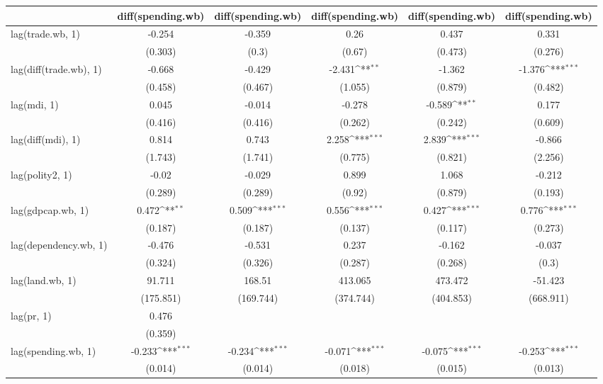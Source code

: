 \def\sym#1{\ifmmode^{#1}\else\(^{#1}\)\fi}
\begin{table}[htbp]
\centering

\begin{tabular}{l*{5}{c}}
\hline\hline
  &\multicolumn{1}{c}{diff(spending.wb)} &\multicolumn{1}{c}{diff(spending.wb)} &\multicolumn{1}{c}{diff(spending.wb)} &\multicolumn{1}{c}{diff(spending.wb)} &\multicolumn{1}{c}{diff(spending.wb)} \\
\hline
lag(trade.wb, 1) 		&-0.254 		&-0.359 		&0.26 		&0.437 		&0.331 \\
  		&(0.303) 		&(0.3) 		&(0.67) 		&(0.473) 		&(0.276) \\
lag(diff(trade.wb), 1) 		&-0.668 		&-0.429 		&-2.431\sym{**} 		&-1.362 		&-1.376\sym{***} \\
  		&(0.458) 		&(0.467) 		&(1.055) 		&(0.879) 		&(0.482) \\
lag(mdi, 1) 		&0.045 		&-0.014 		&-0.278 		&-0.589\sym{**} 		&0.177 \\
  		&(0.416) 		&(0.416) 		&(0.262) 		&(0.242) 		&(0.609) \\
lag(diff(mdi), 1) 		&0.814 		&0.743 		&2.258\sym{***} 		&2.839\sym{***} 		&-0.866 \\
  		&(1.743) 		&(1.741) 		&(0.775) 		&(0.821) 		&(2.256) \\
lag(polity2, 1) 		&-0.02 		&-0.029 		&0.899 		&1.068 		&-0.212 \\
  		&(0.289) 		&(0.289) 		&(0.92) 		&(0.879) 		&(0.193) \\
lag(gdpcap.wb, 1) 		&0.472\sym{**} 		&0.509\sym{***} 		&0.556\sym{***} 		&0.427\sym{***} 		&0.776\sym{***} \\
  		&(0.187) 		&(0.187) 		&(0.137) 		&(0.117) 		&(0.273) \\
lag(dependency.wb, 1) 		&-0.476 		&-0.531 		&0.237 		&-0.162 		&-0.037 \\
  		&(0.324) 		&(0.326) 		&(0.287) 		&(0.268) 		&(0.3) \\
lag(land.wb, 1) 		&91.711 		&168.51 		&413.065 		&473.472 		&-51.423 \\
  		&(175.851) 		&(169.744) 		&(374.744) 		&(404.853) 		&(668.911) \\
lag(pr, 1) 		&0.476 		& 		& 		& 		& \\
  		&(0.359) 		& 		& 		& 		& \\
lag(spending.wb, 1) 		&-0.233\sym{***} 		&-0.234\sym{***} 		&-0.071\sym{***} 		&-0.075\sym{***} 		&-0.253\sym{***} \\
  		&(0.014) 		&(0.014) 		&(0.018) 		&(0.015) 		&(0.013) \\

\end{tabular}
\end{table}
